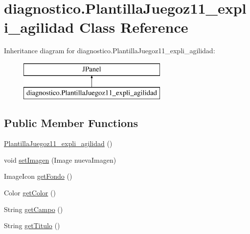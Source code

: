 \hypertarget{classdiagnostico_1_1_plantilla_juegoz11__expli__agilidad}{}\section{diagnostico.\+Plantilla\+Juegoz11\+\_\+expli\+\_\+agilidad Class Reference}
\label{classdiagnostico_1_1_plantilla_juegoz11__expli__agilidad}
Inheritance diagram for diagnostico.\+Plantilla\+Juegoz11\+\_\+expli\+\_\+agilidad\+:\begin{figure}[H]
\begin{center}
\leavevmode
\includegraphics[height=2.000000cm]{classdiagnostico_1_1_plantilla_juegoz11__expli__agilidad}
\end{center}
\end{figure}
\subsection*{Public Member Functions}
\begin{DoxyCompactItemize}
\item 
\mbox{\hyperlink{classdiagnostico_1_1_plantilla_juegoz11__expli__agilidad_a5da1322548fba68dcedfe74949b582d6}{Plantilla\+Juegoz11\+\_\+expli\+\_\+agilidad}} ()
\item 
void \mbox{\hyperlink{classdiagnostico_1_1_plantilla_juegoz11__expli__agilidad_a3937d1d82916f6f57221626caa12db58}{set\+Imagen}} (Image nueva\+Imagen)
\item 
Image\+Icon \mbox{\hyperlink{classdiagnostico_1_1_plantilla_juegoz11__expli__agilidad_a9f90e2a06a3da3724652dd88c68a4da3}{get\+Fondo}} ()
\item 
Color \mbox{\hyperlink{classdiagnostico_1_1_plantilla_juegoz11__expli__agilidad_a2a2c9d1e149b34597c8408cb60e5a31a}{get\+Color}} ()
\item 
String \mbox{\hyperlink{classdiagnostico_1_1_plantilla_juegoz11__expli__agilidad_a8923f7601a3bcaf11a817feac0ad5735}{get\+Campo}} ()
\item 
String \mbox{\hyperlink{classdiagnostico_1_1_plantilla_juegoz11__expli__agilidad_a71f3d0dfb995750b9d0f7aea977f5111}{get\+Titulo}} ()
\end{DoxyCompactItemize}
